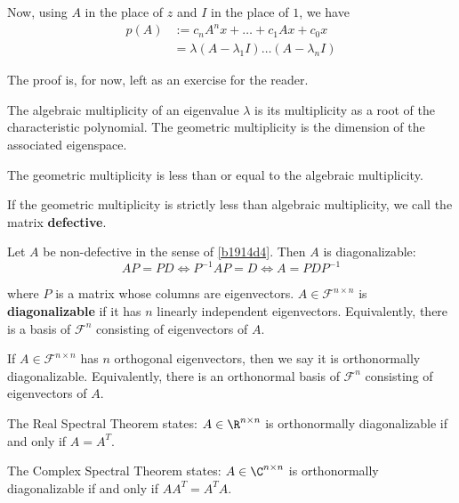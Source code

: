 Now, using $A$ in the place of $z$ and $I$ in the place of $1$, we have
\begin{align*}
  p(A) &:=c_nA^nx+\ldots+c_1Ax+c_0x                \\
       &=\lambda(A-\lambda_1I)\ldots(A-\lambda_nI)
\end{align*}

The proof is, for now, left as an exercise for the reader.

\label{b1914d4}

The algebraic multiplicity of an eigenvalue $\lambda$ is its multiplicity as a
root of the characteristic polynomial. The geometric multiplicity is the
dimension of the associated eigenspace.

The geometric multiplicity is less than or equal to the algebraic multiplicity.

If the geometric multiplicity is strictly less than algebraic multiplicity, we
call the matrix \textbf{defective}.

\label{c318fd7}

Let $A$ be non-defective in the sense of \autoref{b1914d4}. Then $A$ is
diagonalizable:
$$
  AP=PD\iff P^{-1}AP=D\iff A=PDP^{-1}
$$

where $P$ is a matrix whose columns are eigenvectors. $A\in\mathcal F^{n\times
n}$ is \textbf{diagonalizable} if it has $n$ linearly independent eigenvectors.
Equivalently, there is a basis of $\mathcal F^n$ consisting of eigenvectors of
$A$.

\label{ad6ffe5}

If $A\in\mathcal F^{n\times n}$ has $n$ orthogonal eigenvectors, then we say it
is orthonormally diagonalizable. Equivalently, there is an orthonormal basis of
$\mathcal F^n$ consisting of eigenvectors of $A$.

\label{fec0ef5}

The Real Spectral Theorem states: $A\in\R^{n\times n}$ is orthonormally
diagonalizable if and only if $A=A^T$.

The Complex Spectral Theorem states: $A\in\C^{n\times n}$ is orthonormally
diagonalizable if and only if $AA^T=A^TA$.

\label{aa010d6}

